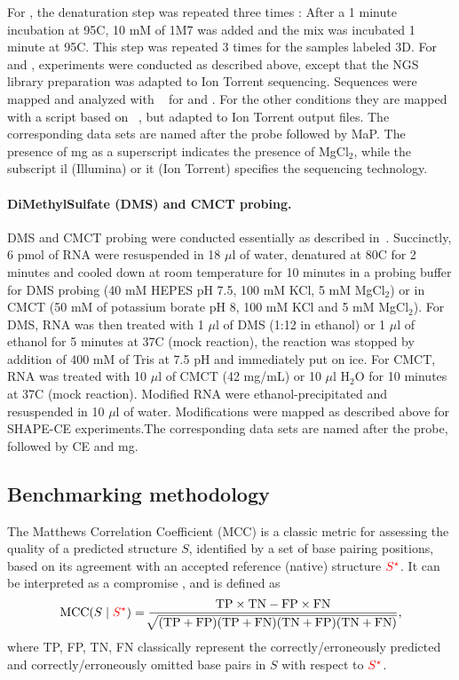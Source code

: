 \documentclass[a4,center,fleqn]{NAR}
\begin{document}
For \OneMSevILUThreeMg, the denaturation step was repeated three times : After a 1 minute incubation at 95\degree{}C, 10 mM of 1M7 was added and the mix was incubated 1 minute at 95\degree{}C. This step was repeated 3 times for the samples labeled 3D. For \NMIA and \NMIAMg, experiments were conducted as described above, except that the NGS library preparation was adapted to Ion Torrent sequencing. Sequences were mapped and analyzed with ~\cite{Busan2018} for \OneMSevILUThreeMg and \OneMSevILUThreeMg. For the other conditions they are mapped with a script based on ~\cite{Smola2015}, but adapted to Ion Torrent output files. The corresponding data sets are named after the probe followed by {\sc MaP}. The presence of {\sc mg} as a superscript indicates the presence of MgCl$_\text{2}$, while the subscript {\sc il} (Illumina) or {\sc it} (Ion Torrent) specifies the sequencing technology. 


\paragraph{DiMethylSulfate (DMS) and CMCT probing.}
DMS and CMCT probing were conducted essentially as described in~\cite{Weill2004,James2008}. Succinctly, 6 pmol of RNA were resuspended in 18 $\mu$l of water, denatured at 80\degree{}C for 2 minutes and cooled down at room temperature for 10 minutes in a probing buffer for DMS probing (40 mM HEPES pH 7.5, 100 mM KCl, 5 mM MgCl$_\text{2}$) or in CMCT (50 mM of potassium borate pH 8, 100 mM KCl and 5 mM MgCl$_\text{2}$). For DMS, RNA was then treated with 1 $\mu$l of DMS (1:12 in ethanol) or 1 $\mu$l of ethanol for 5 minutes at 37\degree{}C (mock reaction), the reaction was stopped by addition of 400 mM of Tris at 7.5 pH and immediately put on ice. For CMCT,  RNA was treated with 10 $\mu$l of CMCT (42 mg/mL) or 10 $\mu$l H$_\text{2}$O for 10 minutes at 37\degree{}C (mock reaction). Modified RNA were ethanol-precipitated and resuspended in 10 $\mu$l of water. Modifications were mapped as described above for SHAPE-CE experiments.The corresponding data sets are named after the probe, followed by {CE} and {\sc mg}.


\subsection*{Benchmarking methodology}

The Matthews Correlation Coefficient (MCC) is a classic metric for assessing the quality of a predicted structure $S$, identified by a set of base pairing positions, based on its agreement with an accepted reference (native) structure ${\color{red} S^{\star}}$. It can be interpreted as a compromise , and is defined as 
$$\text{MCC}(S\mid {\color{red} S^{\star}})=\frac{\text{TP} \times \text{TN} -\text{FP} \times \text{FN}}{\sqrt[]{(\text{TP}+\text{FP})(\text{TP}+\text{FN})(\text{TN}+\text{FP})(\text{TN}+\text{FN})}},$$
where TP, FP, TN, FN classically represent the correctly/erroneously predicted and correctly/erroneously omitted base pairs in $S$ with respect to ${\color{red} S^{\star}}$.
\end{document}
